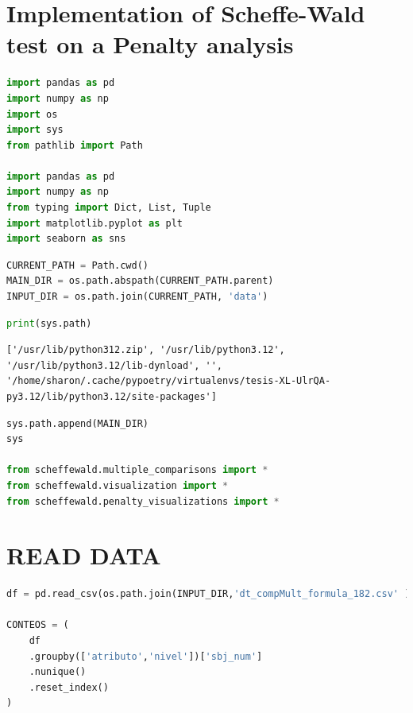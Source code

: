 \hypertarget{implementation-of-scheffe-wald-test-on-a-penalty-analysis}{%
\section{Implementation of Scheffe-Wald test on a Penalty
analysis}\label{implementation-of-scheffe-wald-test-on-a-penalty-analysis}}

\begin{lstlisting}[language=Python]
import pandas as pd
import numpy as np
import os
import sys
from pathlib import Path

import pandas as pd
import numpy as np
from typing import Dict, List, Tuple
import matplotlib.pyplot as plt
import seaborn as sns
\end{lstlisting}

\begin{lstlisting}[language=Python]
CURRENT_PATH = Path.cwd()
MAIN_DIR = os.path.abspath(CURRENT_PATH.parent)
INPUT_DIR = os.path.join(CURRENT_PATH, 'data')
\end{lstlisting}

\begin{lstlisting}[language=Python]
print(sys.path)
\end{lstlisting}

\begin{lstlisting}
['/usr/lib/python312.zip', '/usr/lib/python3.12', '/usr/lib/python3.12/lib-dynload', '', '/home/sharon/.cache/pypoetry/virtualenvs/tesis-XL-UlrQA-py3.12/lib/python3.12/site-packages']
\end{lstlisting}

\begin{lstlisting}[language=Python]
sys.path.append(MAIN_DIR)
sys

from scheffewald.multiple_comparisons import *
from scheffewald.visualization import *
from scheffewald.penalty_visualizations import *
\end{lstlisting}

\hypertarget{read-data}{%
\section{READ DATA}\label{read-data}}

\begin{lstlisting}[language=Python]
df = pd.read_csv(os.path.join(INPUT_DIR,'dt_compMult_formula_182.csv' ))

CONTEOS = (
    df
    .groupby(['atributo','nivel'])['sbj_num']
    .nunique()
    .reset_index()
)
\end{lstlisting}

